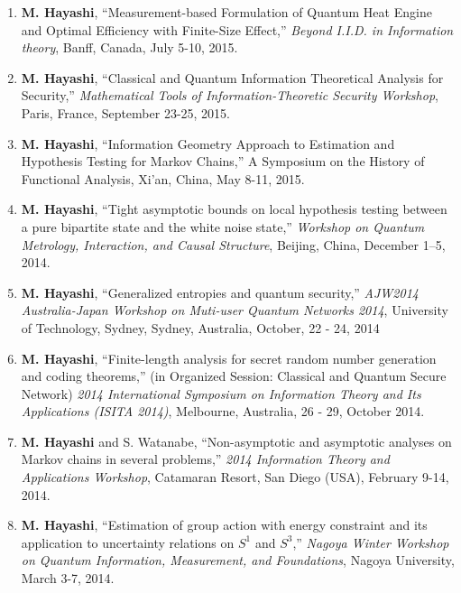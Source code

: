 \documentclass[a4paper,12pt,oneside]{article}
\begin{document}
\begin{enumerate}
\item 
\textbf{M. Hayashi}, ``Measurement-based Formulation of Quantum Heat Engine and Optimal Efficiency with Finite-Size Effect,'' 
{\em Beyond I.I.D. in Information theory}, Banff, Canada, July 5-10, 2015.

\item 
\textbf{M. Hayashi}, ``Classical and Quantum Information Theoretical Analysis for Security,'' 
{\em Mathematical Tools of Information-Theoretic Security Workshop}, Paris, France, September 23-25, 2015.



\item 
\textbf{M. Hayashi},
``Information Geometry Approach to Estimation and Hypothesis Testing for Markov Chains,'' 
A Symposium on the History of Functional Analysis, Xi'an, 
China, May 8-11, 2015. 

\item 
\textbf{M. Hayashi}, 
``Tight asymptotic bounds on local hypothesis testing between a pure bipartite state and the white noise state,''
{\em Workshop on Quantum Metrology, Interaction, and Causal Structure},
Beijing, China, December 1--5, 2014. 

\item 
\textbf{M. Hayashi}, 
``Generalized entropies and quantum security,'' 
{\em AJW2014 Australia-Japan Workshop on Muti-user Quantum Networks 2014}, University of Technology, Sydney, Sydney, Australia, 
October, 22 - 24, 2014

\item 
\textbf{M. Hayashi},
``Finite-length analysis for secret random number generation and coding theorems,'' 
(in Organized Session: Classical and Quantum Secure Network) 
{\em 2014 International Symposium on Information Theory and Its Applications (ISITA 2014)}, Melbourne, Australia, 26 - 29, October 2014.

\item 
\textbf{M. Hayashi} and S. Watanabe, 
``Non-asymptotic and asymptotic analyses on Markov chains in several problems,'' 
{\em 2014 Information Theory and Applications Workshop}, 
Catamaran Resort, San Diego (USA), February 9-14, 2014.

\item 
\textbf{M. Hayashi}, 
``Estimation of group action with energy constraint and its application to uncertainty relations on $S^1$ and $S^3$,'' 
{\em Nagoya Winter Workshop on Quantum Information, Measurement, and Foundations}, 
Nagoya University, March 3-7, 2014.


\end{enumerate}
\end{document}
